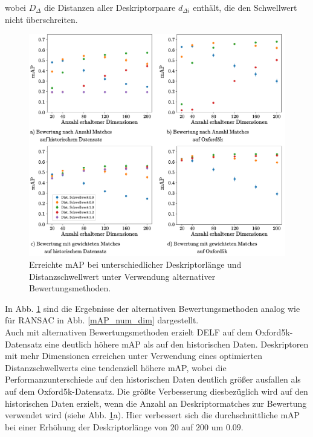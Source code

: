 wobei $D_\Delta$ die Distanzen aller Deskriptorpaare $d_{\Delta i}$ enthält, die den Schwellwert nicht überschreiten.
\begin{figure}[h]
\includegraphics[scale=0.73]{mAp_num_dim_scoring_methods}
\caption{Erreichte mAP bei unterschiedlicher Deskriptorlänge und Distanzschwellwert unter Verwendung alternativer Bewertungsmethoden.}
\label{mAP_num_dim_scoring_methods}
\end{figure}
In Abb. \ref{mAP_num_dim_scoring_methods} sind die Ergebnisse der alternativen Bewertungsmethoden analog wie für RANSAC in Abb. \ref{mAP_num_dim} dargestellt.\\
Auch mit alternativen Bewertungsmethoden erzielt DELF auf dem Oxford5k-Datensatz eine deutlich höhere mAP als auf den historischen Daten. 
Deskriptoren mit mehr Dimensionen erreichen unter Verwendung eines optimierten Distanzschwellwerts eine tendenziell höhere mAP, wobei die Performanzunterschiede auf den historischen Daten deutlich größer ausfallen als auf dem Oxford5k-Datensatz. Die größte Verbesserung diesbezüglich wird auf den historischen Daten erzielt, wenn die Anzahl an Deskriptormatches zur Bewertung verwendet wird (siehe Abb. \ref{mAP_num_dim_scoring_methods}a). Hier verbessert sich die durchschnittliche mAP bei einer Erhöhung der Deskriptorlänge von $20$ auf $200$  um $0.09$.\\
